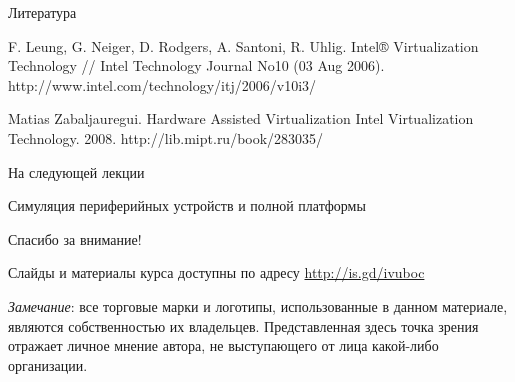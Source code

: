 \documentclass{beamer}
\begin{document}
\begin{frame}[allowframebreaks]{Литература}
\begin{thebibliography}{99}
     F. Leung, G. Neiger, D. Rodgers, A. Santoni, R. Uhlig. Intel®
    Virtualization Technology // Intel Technology Journal No10 (03
Aug 2006).
http://www.intel.com/technology/itj/2006/v10i3/


Matias Zabaljauregui. Hardware Assisted Virtualization
Intel Virtualization Technology. 2008.
http://lib.mipt.ru/book/283035/


\end{thebibliography}
\end{frame}


\begin{frame}{На следующей лекции}
\centering

Симуляция периферийных устройств и полной платформы

\end{frame}

\begin{frame}

{\huge{Спасибо за внимание!}\par}

\vfill

Слайды и материалы курса доступны по адресу \url{http://is.gd/ivuboc} %

\vfill

\tiny{\textit{Замечание}: все торговые марки и логотипы, использованные в данном материале, являются собственностью их владельцев. Представленная здесь точка зрения отражает личное мнение автора, не выступающего от лица какой-либо организации.}

\end{frame}
\end{document}
